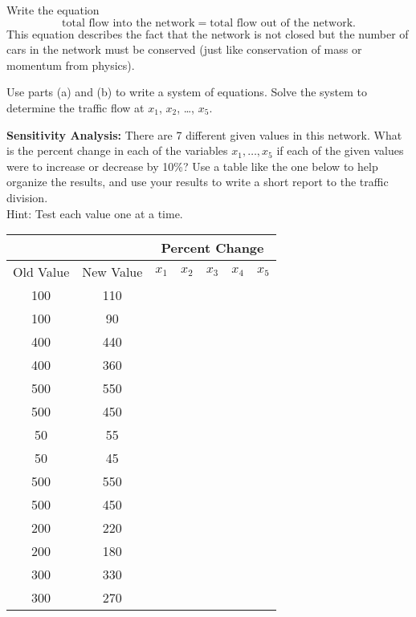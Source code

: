 \begin{lab}
    \item Write the equation
        \[ \text{total flow into the network} = \text{total flow out of the network}. \]
        This equation describes the fact that the network is not closed but the number of
        cars in the network must be conserved (just like conservation of mass or
        momentum from physics).
    \item Use parts (a) and (b) to write a system of equations.  Solve the system to
        determine the traffic flow at $x_1$, $x_2$, \dots, $x_5$.
    \item {\bf Sensitivity Analysis:} There are 7 different given values in this network.
        What is the percent change in each of the variables $x_1,\dots, x_5$ if each of
        the given values were to increase or decrease by 10\%?  Use a table like the one
        below to help organize the results, and use your results to write a short report
        to the traffic division.\\ Hint: Test each value one at a time.

        \begin{center}
            \begin{tabular}{|c|c||c|c|c|c|c|}
                \hline
                & & \multicolumn{5}{|c|}{Percent Change} \\ \hline
                Old Value & New Value & $x_1$ & $x_2$ & $x_3$ & $x_4$ & $x_5$ \\ \hline
                \hline
                100 & 110 & & & & & \\\hline
                100 & 90 & & & & & \\\hline\hline
                400 & 440 & & & & & \\\hline
                400 & 360 & & & & & \\\hline\hline
                500 & 550 & & & & & \\\hline
                500 & 450 & & & & & \\\hline\hline
                50 & 55 & & & & & \\\hline
                50 & 45 & & & & & \\\hline\hline
                500 & 550 & & & & & \\\hline
                500 & 450 & & & & & \\\hline\hline
                200 & 220 & & & & & \\\hline
                200 & 180 & & & & & \\\hline\hline
                300 & 330 & & & & & \\\hline
                300 & 270 & & & & & \\\hline
            \end{tabular}
        \end{center}
\ea

\end{lab}


